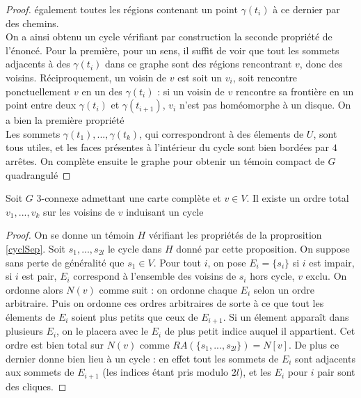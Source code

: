 \documentclass{scrartcl}
\begin{document}
\begin{flushleft}
\begin{proof}
    également toutes les régions contenant un point $\gamma(t_i)$ à ce dernier par des chemins.\\
    On a ainsi obtenu un cycle vérifiant par construction la seconde propriété de l'énoncé. Pour la première, pour un sens,
    il suffit de voir que tout les sommets adjacents à des $\gamma(t_i)$ dans ce graphe sont des régions rencontrant $v$, donc des
    voisins. Réciproquement, un voisin de $v$ est soit un $v_i$, soit rencontre ponctuellement $v$ en un des $\gamma(t_i)$ : si un
    voisin de $v$ rencontre sa frontière en un point entre deux $\gamma(t_i)$ et $\gamma(t_{i+1})$, $v_i$ n'est pas homéomorphe à
    un disque. On a bien la première propriété\\
    Les sommets $\gamma(t_1), ..., \gamma(t_k)$, qui correspondront à des élements de $U$, sont tous utiles,
    et les faces présentes à l'intérieur du cycle sont bien bordées par $4$ arrêtes. On complète ensuite le graphe pour obtenir un
    témoin compact de $G$ quadrangulé
\end{proof}

\begin{cor}\label{ordCycl}
    Soit $G$ $3$-connexe admettant une carte complète et $v \in V$. Il existe un ordre total $v_1, ..., v_k$ sur les voisins de $v$
    induisant un cycle
\end{cor}

\begin{proof}
    On se donne un témoin $H$ vérifiant les propriétés de la proprosition \ref{cyclSep}. Soit $s_1, ..., s_{2l}$ le cycle dans $H$
    donné par cette proposition. On suppose sans perte de généralité que $s_1 \in V$. Pour tout $i$, on pose $E_i = \{s_i\}$
    si $i$ est impair, si $i$ est pair, $E_i$ correspond à l'ensemble des voisins de $s_i$ hors cycle, $v$ exclu. On ordonne alors $N(v)$
    comme suit : on ordonne chaque $E_i$ selon un ordre arbitraire. Puis on ordonne ces ordres arbitraires de sorte à ce que
    tout les élements de $E_i$ soient plus petits que ceux de $E_{i+1}$. Si un élement apparaît dans plusieurs $E_i$, on le placera avec
    le $E_i$ de plus petit indice auquel il appartient. Cet ordre est bien total sur $N(v)$
    comme $RA(\{s_1, ..., s_{2l}\}) = N[v]$. De plus ce dernier donne bien lieu à un cycle : en effet tout les sommets de $E_i$ sont
    adjacents aux sommets de $E_{i+1}$ (les indices étant pris modulo $2l$), et les $E_i$ pour $i$ pair sont des cliques.
\end{proof}




\end{flushleft}
\end{document}
